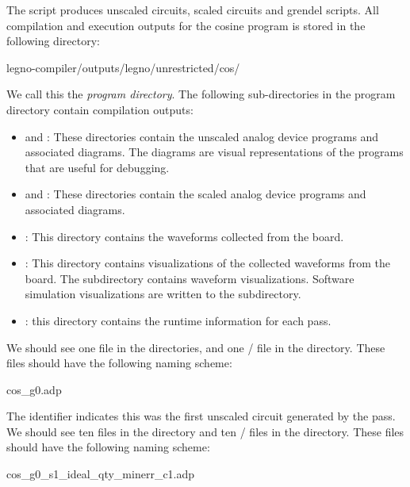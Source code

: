 The  script produces unscaled circuits, scaled circuits and
grendel scripts. All compilation and execution outputs for the cosine program is
stored in the following directory:

\begin{snippet}
  legno-compiler/outputs/legno/unrestricted/cos/
\end{snippet}

We call this the \textit{program directory}. The following sub-directories in the
program directory contain compilation outputs:

\begin{itemize}
\item{} and : These directories contain the
  unscaled analog device programs and associated diagrams. The diagrams are visual
  representations of the programs that are useful for debugging.
\item{} and : These directories contain the
  scaled analog device programs and associated diagrams. 
\item {}: This directory contains the waveforms collected from
  the \hcdc board.
\item {}: This directory contains visualizations of the collected
  waveforms from the \hcdc board. The  subdirectory contains \hcdc
  waveform visualizations. Software simulation visualizations are written
  to the  subdirectory. 
\item{}: this directory contains the runtime information for each
  pass.
\end{itemize}

We should see one  file in the 
directories, and one / file in the 
directory. These files should have the following naming scheme: 

\begin{snippet}
  cos_g0.adp
\end{snippet}

The  identifier indicates this was the first unscaled circuit generated
by the  pass. We should see ten  files in the
 directory and ten / files in the
 directory. These files should have the following naming scheme:

\begin{snippet}
  cos_g0_s1_ideal_qty_minerr_c1.adp 
\end{snippet}


